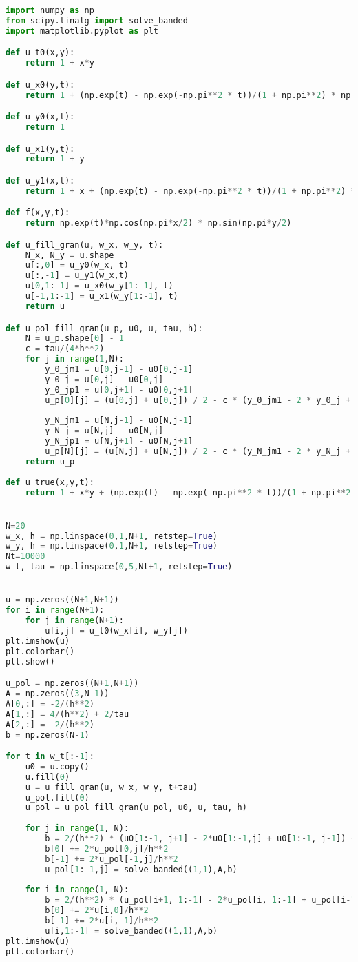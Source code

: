 \begin{lstlisting}[language=Python, caption=Реализация продольно-поперечной схемы на языке Python, label=adi]
import numpy as np
from scipy.linalg import solve_banded
import matplotlib.pyplot as plt

def u_t0(x,y):
    return 1 + x*y

def u_x0(y,t):
    return 1 + (np.exp(t) - np.exp(-np.pi**2 * t))/(1 + np.pi**2) * np.sin(np.pi * y / 2)

def u_y0(x,t):
    return 1

def u_x1(y,t):
    return 1 + y

def u_y1(x,t):
    return 1 + x + (np.exp(t) - np.exp(-np.pi**2 * t))/(1 + np.pi**2) * np.cos(np.pi * x / 2)

def f(x,y,t):
    return np.exp(t)*np.cos(np.pi*x/2) * np.sin(np.pi*y/2)

def u_fill_gran(u, w_x, w_y, t):
    N_x, N_y = u.shape
    u[:,0] = u_y0(w_x, t)
    u[:,-1] = u_y1(w_x,t)
    u[0,1:-1] = u_x0(w_y[1:-1], t)
    u[-1,1:-1] = u_x1(w_y[1:-1], t)
    return u

def u_pol_fill_gran(u_p, u0, u, tau, h):
    N = u_p.shape[0] - 1
    c = tau/(4*h**2)
    for j in range(1,N):
        y_0_jm1 = u[0,j-1] - u0[0,j-1]
        y_0_j = u[0,j] - u0[0,j]
        y_0_jp1 = u[0,j+1] - u0[0,j+1]
        u_p[0][j] = (u[0,j] + u[0,j]) / 2 - c * (y_0_jm1 - 2 * y_0_j + y_0_jp1)
        
        y_N_jm1 = u[N,j-1] - u0[N,j-1]
        y_N_j = u[N,j] - u0[N,j]
        y_N_jp1 = u[N,j+1] - u0[N,j+1]
        u_p[N][j] = (u[N,j] + u[N,j]) / 2 - c * (y_N_jm1 - 2 * y_N_j + y_N_jp1)
    return u_p
    
def u_true(x,y,t):
    return 1 + x*y + (np.exp(t) - np.exp(-np.pi**2 * t))/(1 + np.pi**2) * np.sin(np.pi * y / 2) * np.cos(np.pi * x / 2)


N=20
w_x, h = np.linspace(0,1,N+1, retstep=True)
w_y, h = np.linspace(0,1,N+1, retstep=True)
Nt=10000
w_t, tau = np.linspace(0,5,Nt+1, retstep=True)


u = np.zeros((N+1,N+1))
for i in range(N+1):
    for j in range(N+1):
        u[i,j] = u_t0(w_x[i], w_y[j])
plt.imshow(u)
plt.colorbar()
plt.show()

u_pol = np.zeros((N+1,N+1))
A = np.zeros((3,N-1))
A[0,:] = -2/(h**2)
A[1,:] = 4/(h**2) + 2/tau
A[2,:] = -2/(h**2)
b = np.zeros(N-1)

for t in w_t[:-1]:
    u0 = u.copy()
    u.fill(0)
    u = u_fill_gran(u, w_x, w_y, t+tau)
    u_pol.fill(0)
    u_pol = u_pol_fill_gran(u_pol, u0, u, tau, h)
    
    for j in range(1, N):
        b = 2/(h**2) * (u0[1:-1, j+1] - 2*u0[1:-1,j] + u0[1:-1, j-1]) + 2*u0[1:-1,j]/tau + f(w_x[1:-1], w_y[j], t+tau/2)
        b[0] += 2*u_pol[0,j]/h**2
        b[-1] += 2*u_pol[-1,j]/h**2
        u_pol[1:-1,j] = solve_banded((1,1),A,b)
    
    for i in range(1, N):
        b = 2/(h**2) * (u_pol[i+1, 1:-1] - 2*u_pol[i, 1:-1] + u_pol[i-1, 1:-1]) + 2*u_pol[i, 1:-1]/tau + f(w_x[i], w_y[1:-1], t+tau)
        b[0] += 2*u[i,0]/h**2
        b[-1] += 2*u[i,-1]/h**2
        u[i,1:-1] = solve_banded((1,1),A,b)
plt.imshow(u)
plt.colorbar()

\end{lstlisting}
